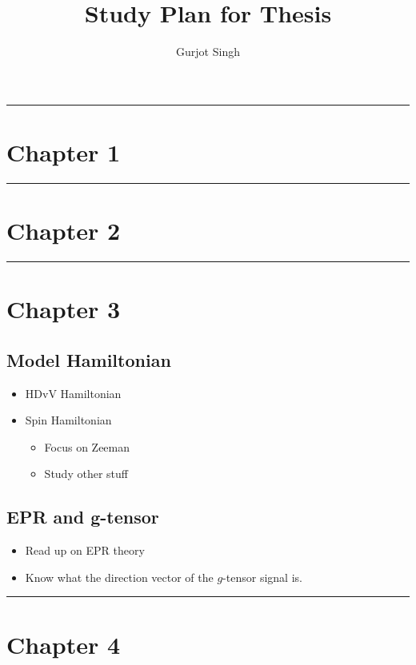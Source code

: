 \documentclass{article}
\title{Study Plan for Thesis}
\author{Gurjot Singh}
\newcommand*\sepline
{
  \begin{center}
    \rule[1ex]{.7\textwidth}{.5pt}
  \end{center}
}
\begin{document}
\maketitle

\sepline

\section{Chapter 1}

\sepline

\section{Chapter 2}


\sepline

\section{Chapter 3}

\subsection{Model Hamiltonian}

\begin{itemize}
    \item HDvV Hamiltonian
    \item Spin Hamiltonian
    \begin{itemize}
        \item Focus on Zeeman
        \item Study other stuff
    \end{itemize}
\end{itemize}

\subsection{EPR and g-tensor}

\begin{itemize}
    \item Read up on EPR theory
    \item Know what the direction vector of the $g$-tensor signal is.
\end{itemize}

\sepline

\section{Chapter 4}
\end{document}
